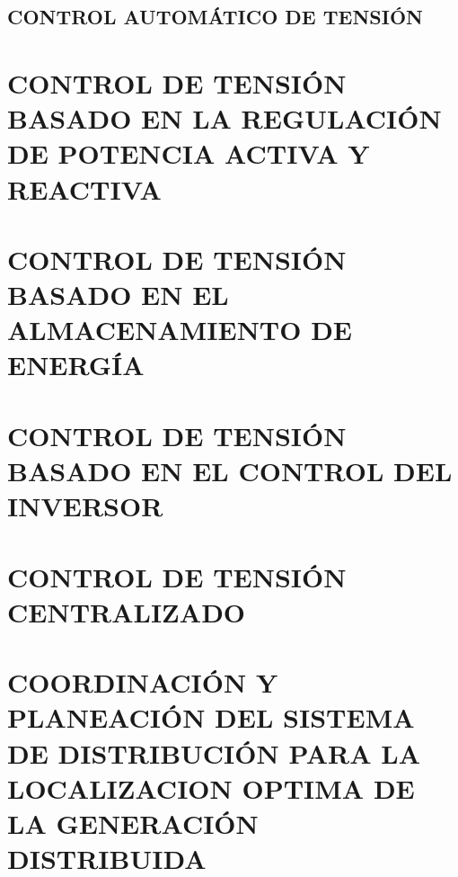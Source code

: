 \documentclass[12pt, letterpaper]{report}
\begin{document}
\section{CONTROL AUTOMÁTICO DE TENSIÓN}


\chapter{CONTROL DE TENSIÓN BASADO EN LA REGULACIÓN DE POTENCIA ACTIVA Y REACTIVA}
\label{cap_reactiva}

\cite{Bisanovic2014}

\cite{Singh2016}


\cite{Oshiro2011}
\chapter{CONTROL DE TENSIÓN BASADO EN EL ALMACENAMIENTO DE ENERGÍA}
\label{cap_almacenamiento}
\chapter{CONTROL DE TENSIÓN BASADO EN EL CONTROL DEL INVERSOR }
\label{cap_inversor}
\chapter{CONTROL DE TENSIÓN CENTRALIZADO}
\label{cap_central}
\chapter{COORDINACIÓN Y PLANEACIÓN  DEL SISTEMA DE DISTRIBUCIÓN PARA LA LOCALIZACION OPTIMA DE LA GENERACIÓN DISTRIBUIDA }


\label{cap_planeacion}
\cite{Idlbi2013}



%
\end{document}
